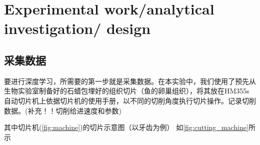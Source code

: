 \section{Experimental work/analytical investigation/ design}

\subsection{采集数据}
要进行深度学习，所需要的第一步就是采集数据。在本实验中，我们使用了预先从生物实验室制备好的石蜡包埋好的组织切片（鱼的卵巢组织），将其放在HM355s自动切片机上依据切片机的使用手册，以不同的切削角度执行切片操作。记录切削数据。(补充！！切削给进速度和参数)


其中切片机(\autoref{fig:machine})的切片示意图（以牙齿为例） 如\autoref{fig:cutting_machine}所示

